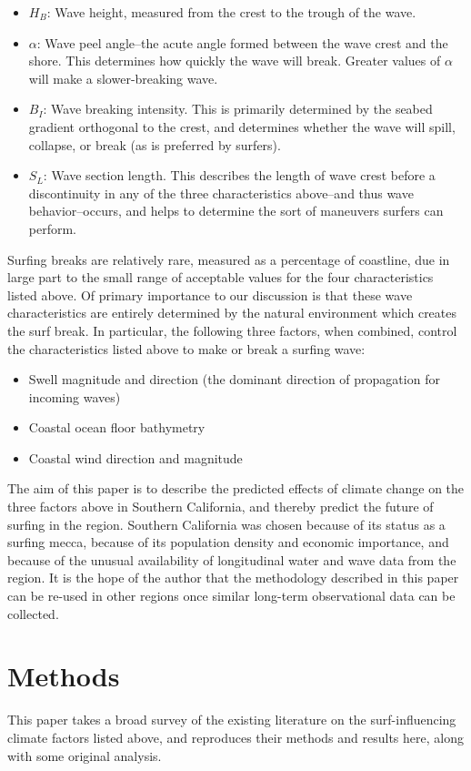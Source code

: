 \documentclass[12pt, letterpaper]{article}
\begin{document}
	\begin{itemize}
		\item $H_B$: Wave height, measured from the crest to the trough of the wave.
		\item $\alpha$: Wave peel angle--the acute angle formed between the wave crest and the shore. This determines how quickly the wave will break. Greater values of $\alpha$ will make a slower-breaking wave.
		\item $B_I$: Wave breaking intensity. This is primarily determined by the seabed gradient orthogonal to the crest, and determines whether the wave will spill, collapse, or break (as is preferred by surfers).
		\item $S_L$: Wave section length. This describes the length of wave crest before a discontinuity in any of the three characteristics above--and thus wave behavior--occurs, and helps to determine the sort of maneuvers surfers can perform.
	\end{itemize}

	Surfing breaks are relatively rare, measured as a percentage of coastline, due in large part to the small range of acceptable values for the four characteristics listed above. Of primary importance to our discussion is that these wave characteristics are entirely determined by the natural environment which creates the surf break. In particular, the following three factors, when combined, control the characteristics listed above to make or break a surfing wave: \citep{surfing-science}
	\begin{itemize}
		\item Swell magnitude and direction (the dominant direction of propagation for incoming waves)
		\item Coastal ocean floor bathymetry
		\item Coastal wind direction and magnitude
	\end{itemize}
	The aim of this paper is to describe the predicted effects of climate change on the three factors above in Southern California, and thereby predict the future of surfing in the region. Southern California was chosen because of its status as a surfing mecca, because of its population density and economic importance, and because of the unusual availability of longitudinal water and wave data from the region. It is the hope of the author that the methodology described in this paper can be re-used in other regions once similar long-term observational data can be collected.

	\section{Methods}
	This paper takes a broad survey of the existing literature on the surf-influencing climate factors listed above, and reproduces their methods and results here, along with some original analysis. 
\end{document}
